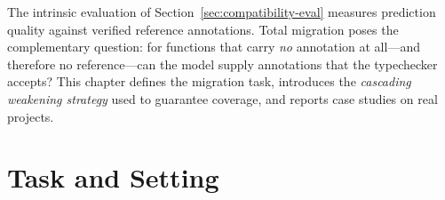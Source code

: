


The intrinsic evaluation of Section~\ref{sec:compatibility-eval} measures prediction quality against verified reference annotations.
Total migration poses the complementary question: for functions that carry \emph{no} annotation at all---and therefore no reference---can the model supply annotations that the typechecker accepts?
This chapter defines the migration task, introduces the \emph{cascading weakening strategy} used to guarantee coverage, and reports case studies on real projects.

\section{Task and Setting}
\label{sec:migration-task}

